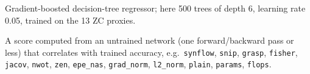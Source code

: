 \documentclass[pdflatex,sn-mathphys-ay]{sn-jnl}
\newcommand{\code}[1]{\texttt{#1}}
\begin{document}
\begin{appendices}
\begin{description}[style=nextline,leftmargin=0pt,itemsep=3pt]
\item[XGBoost.] Gradient-boosted decision-tree regressor; here 500 trees of depth 6, learning rate 0.05, trained on the 13 ZC proxies.

\item[Zero-cost (ZC) proxy.] A score computed from an untrained network (one forward/backward pass or less) that correlates with trained accuracy, e.g.\ \code{synflow}, \code{snip}, \code{grasp}, \code{fisher}, \code{jacov}, \code{nwot}, \code{zen}, \code{epe\_nas}, \code{grad\_norm}, \code{l2\_norm}, \code{plain}, \code{params}, \code{flops}.
\end{description}
\end{appendices}


\end{document}
